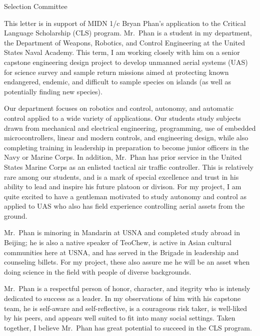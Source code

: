 \documentclass[12pt]{wrceletter}
\date{\today}
\begin{document}
\begin{letter}{%
Selection Committee}

\opening{}
\raggedright 
\setlength{\parindent}{15pt}

This letter is in support of MIDN 1/c Bryan Phan's application to the Critical Language Scholarship (CLS) program. Mr.~Phan is a student in my department, the Department of Weapons, Robotics, and Control Engineering at the United States Naval Academy. This term, I am working closely with him on a senior capstone engineering design project to develop unmanned aerial systems (UAS) for science survey and sample return missions aimed at protecting known endangered, endemic, and difficult to sample species on islands (as well as potentially finding new species). 
 
Our department focuses on robotics and control, autonomy, and automatic control applied to a wide variety of applications. Our students study subjects drawn from mechanical and electrical engineering, programming, use of embedded microcontrollers, linear and modern controls, and engineering design, while also completing training in leadership in preparation to become junior officers in the Navy or Marine Corps. In addition, Mr.~Phan has prior service in the United States Marine Corps as an enlisted tactical air traffic controller. This is relatively rare among our students, and is a mark of special excellence and trust in his ability to lead and inspire his future platoon or divison. For my project, I am quite excited to have a gentleman motivated to study autonomy and control as applied to UAS who also has field experience controlling aerial assets from the ground. 
 
Mr.~Phan is minoring in Mandarin at USNA and completed study abroad in Beijing; he is also a native speaker of TeoChew, is active in Asian cultural communities here at USNA, and has served in the Brigade in leadership and counseling billets. For my project, these also assure me he will be an asset when doing science in the field with people of diverse backgrounds. 

Mr.~Phan is a respectful person of honor, character, and itegrity who is intensly dedicated to success as a leader. In my observations of him with his capstone team, he is self-aware and self-reflective, is a courageous risk taker, is well-liked by his peers, and appears well suited to fit into many social settings. Taken together, I believe Mr.~Phan has great potential to succeed in the CLS program. 

\closing{~} %

\end{letter}
\end{document}
